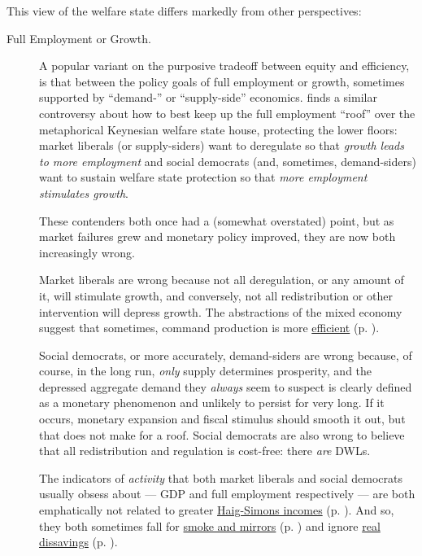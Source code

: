This view of the welfare state differs markedly from other perspectives:
\begin{description}
	\item[Full Employment or Growth.] A popular variant on the purposive tradeoff between equity and efficiency, is that between the policy goals of full employment or growth, sometimes supported by ``demand-'' or ``supply-side'' economics. %
	\citeauthor{Offe2003} \citeyearpar[453]{Offe2003} finds a similar controversy about how to best keep up the full employment ``roof'' over the metaphorical Keynesian welfare state house, protecting the lower floors: market liberals (or supply-siders) want to deregulate so that \emph{growth leads to more employment} and social democrats (and, sometimes, demand-siders) want to sustain welfare state protection so that \emph{more employment stimulates growth}. 
	
	These contenders both once had a (somewhat overstated) point, but as market failures grew and monetary policy improved, they are now both increasingly wrong. 
	
	Market liberals are wrong because not all deregulation, or any amount of it, will stimulate growth, and conversely, not all redistribution or other intervention will depress growth. The abstractions of the mixed economy suggest that sometimes, command production is more \hyperref[sec:market_failures]{efficient} (p. \pageref{sec:market_failures}).
	
	Social democrats, or more accurately, demand-siders are wrong because, of course, in the long run, \emph{only} supply determines prosperity, and the depressed aggregate demand they \emph{always} seem to suspect is clearly defined as a monetary phenomenon and unlikely to persist for very long. If it occurs, monetary expansion and fiscal stimulus should smooth it out, but that does not make for a roof. Social democrats are also wrong to believe that all redistribution and regulation is cost-free: there \emph{are} \glspl{DWL}. 
	
	The indicators of \emph{activity} that both market liberals and social democrats usually obsess about --- \gls{GDP} and full employment respectively --- are both emphatically not related to greater \hyperref[sec:tradeoffs]{Haig-Simons incomes} (p. \pageref{sec:tradeoffs}). And so, they both sometimes fall for \hyperref[sec:smoke_n_mirrors]{smoke and mirrors} (p. \pageref{sec:smoke_n_mirrors}) and ignore \hyperref[sec:real_dissavings]{real dissavings} (p. \pageref{sec:real_dissavings}). %
	

\end{description}
